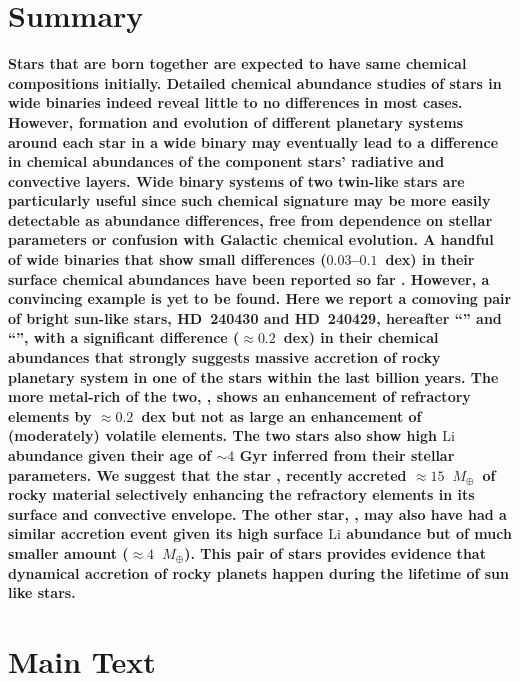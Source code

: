\documentclass[12pt,letterpaper,margin=1in]{article}
\newcommand*\elem[1]{\ensuremath{\mathrm{#1}}}
\newcommand{\sunanalog}{\text{Krios}}
\newcommand{\bizarreone}{\text{Kronos}}
\newcommand{\mearth}{\ensuremath{M_\oplus}}
\begin{document}
\section{Summary}
{\bf \noindent
  Stars that are born together are expected to have same chemical compositions
  initially.
  Detailed chemical abundance studies of stars in wide binaries indeed reveal
  little to no differences in most cases\citep{Gratton:2001aa,Desidera:2004aa}.
  However, formation and evolution of different planetary systems around each
  star in a wide binary may eventually lead to a difference in chemical
  abundances of the component stars' radiative and convective
  layers\cite{Pinsonneault:2001aa,Chambers:2010aa}.
  Wide binary systems of two twin-like stars are particularly useful since such
  chemical signature may be more easily detectable as abundance differences,
  free from dependence on stellar parameters or confusion with Galactic chemical
  evolution.
  A handful of wide binaries that show small differences ($0.03$--$0.1$~dex)
  in their surface chemical abundances have been reported so far
  \cite{Mack:2014aa,Mack:2016aa,Saffe:2015aa,Teske:2013aa,
    Teske:2015aa,Teske:2016aa,Teske:2016ab,Biazzo:2015aa,Ramirez:2015aa}.
  However, a convincing example is yet to be found.
  Here we report a comoving pair of bright sun-like stars, HD~240430 and HD~240429,
  hereafter ``\bizarreone'' and ``\sunanalog'',
  with a significant difference ($\approx 0.2$~dex) in their chemical
  abundances that strongly suggests massive accretion of rocky planetary system in one
  of the stars within the last billion years.
  The more metal-rich of the two, \bizarreone, shows an enhancement of refractory
  elements by $\approx 0.2$~dex but not as large
  an enhancement of (moderately) volatile elements.
  The two stars also show high \elem{Li} abundance given their age of $\sim 4$ Gyr
  inferred from their stellar parameters.
  We suggest that the star \bizarreone, recently accreted
  $\approx 15$~\mearth\ of rocky material selectively enhancing the
  refractory elements in its surface and convective envelope.
  The other star, \sunanalog, may also have had a similar accretion
  event given its high surface \elem{Li} abundance but of much smaller amount
  ($\approx 4$~\mearth).
  This pair of stars provides evidence that dynamical accretion of rocky planets
  happen during the lifetime of sun like stars.
}

\section{Main Text}
\end{document}
